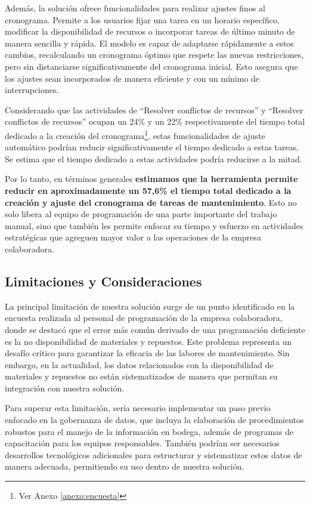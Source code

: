 \documentclass{article}
\begin{document}
Además, la solución ofrece funcionalidades para realizar ajustes finos al cronograma. Permite a los usuarios fijar una tarea en un horario específico, modificar la disponibilidad de recursos o incorporar tareas de último minuto de manera sencilla y rápida. El modelo es capaz de adaptarse rápidamente a estos cambios, recalculando un cronograma óptimo que respete las nuevas restricciones, pero sin distanciarse significativamente del cronograma inicial. Esto asegura que los ajustes sean incorporados de manera eficiente y con un mínimo de interrupciones.


Considerando que las actividades de ``Resolver conflictos de recursos'' y ``Resolver conflictos de recursos'' ocupan un 24\% y un 22\% respectivamente del tiempo total dedicado a la creación del cronograma\footnote{Ver Anexo \ref{anexo:encuesta}}, estas funcionalidades de ajuste automático podrían reducir significativamente el tiempo dedicado a estas tareas. Se estima que el tiempo dedicado a estas actividades podría reducirse a la mitad.

Por lo tanto, en términos generales \textbf{estimamos que la herramienta permite reducir en aproximadamente un 57,6\%  el tiempo total dedicado a la creación y ajuste del cronograma de tareas de mantenimiento}. Esto no solo libera al equipo de programación de una parte importante del trabajo manual, sino que también les permite enfocar su tiempo y esfuerzo en actividades estratégicas que agreguen mayor valor a las operaciones de la empresa colaboradora.

\subsection{Limitaciones y Consideraciones}

La principal limitación de nuestra solución surge de un punto identificado en la encuesta realizada al personal de programación de la empresa colaboradora, donde se destacó que el error más común derivado de una programación deficiente es la no disponibilidad de materiales y repuestos. Este problema representa un desafío crítico para garantizar la eficacia de las labores de mantenimiento. Sin embargo, en la actualidad, los datos relacionados con la disponibilidad de materiales y repuestos no están sistematizados de manera que permitan su integración con nuestra solución.

Para superar esta limitación, sería necesario implementar un paso previo enfocado en la gobernanza de datos, que incluya la elaboración de procedimientos robustos para el manejo de la información en bodega, además de programas de capacitación para los equipos responsables. También podrían ser necesarios desarrollos tecnológicos adicionales para estructurar y sistematizar estos datos de manera adecuada, permitiendo su uso dentro de nuestra solución.
\end{document}
